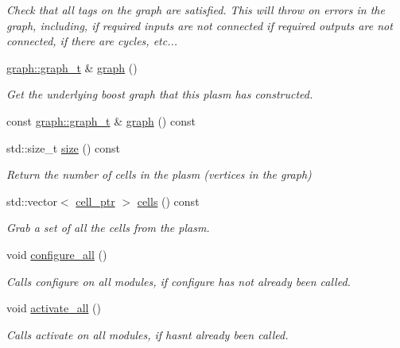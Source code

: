 \begin{DoxyCompactItemize}
\begin{DoxyCompactList}\small\item\em Check that all tags on the graph are satisfied. This will throw on errors in the graph, including, if required inputs are not connected if required outputs are not connected, if there are cycles, etc... \end{DoxyCompactList}\item 
\hyperlink{structecto_1_1graph_1_1graph__t}{graph\+::graph\+\_\+t} \& \hyperlink{structecto_1_1plasm_a4f8de02440afdad0aa395fbaea03399e}{graph} ()
\begin{DoxyCompactList}\small\item\em Get the underlying boost graph that this plasm has constructed. \end{DoxyCompactList}\item 
const \hyperlink{structecto_1_1graph_1_1graph__t}{graph\+::graph\+\_\+t} \& \hyperlink{structecto_1_1plasm_ac6cde6d1d615e85f442ce299fdf0e7a0}{graph} () const 
\item 
std\+::size\+\_\+t \hyperlink{structecto_1_1plasm_aaeeabeb3f78c1a7291eb14e0f705574e}{size} () const 
\begin{DoxyCompactList}\small\item\em Return the number of cells in the plasm (vertices in the graph) \end{DoxyCompactList}\item 
std\+::vector$<$ \hyperlink{namespaceecto_aed1809e82b9229ea81ef9ee3438cf62c}{cell\+\_\+ptr} $>$ \hyperlink{structecto_1_1plasm_aa7724234d631563b10de07030c066e01}{cells} () const 
\begin{DoxyCompactList}\small\item\em Grab a set of all the cells from the plasm. \end{DoxyCompactList}\item 
void \hyperlink{structecto_1_1plasm_a55d56445bd1d09b9422390fb49e81bec}{configure\+\_\+all} ()
\begin{DoxyCompactList}\small\item\em Calls configure on all modules, if configure has not already been called. \end{DoxyCompactList}\item 
void \hyperlink{structecto_1_1plasm_a4419135c6c8dd8bb0cc7f4807a025df2}{activate\+\_\+all} ()
\begin{DoxyCompactList}\small\item\em Calls activate on all modules, if hasn\textquotesingle{}t already been called. \end{DoxyCompactList}\item 

\end{DoxyCompactItemize}
